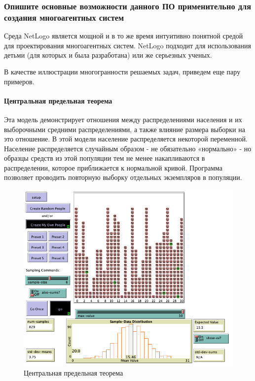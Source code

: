 \documentclass[14pt,a4paper,report]{report}
\begin{document}
\subsubsection{Опишите основные возможности данного ПО применительно для создания многоагентных систем}

Среда NetLogo является мощной и в то же время интуитивно понятной средой для проектирования многоагентных систем. NetLogo подходит для использования детьми (для которых и была разработана) или же серьезных ученых.

В качестве иллюстрации многогранности решаемых задач, приведем еще пару примеров.

\paragraph{Центральная предельная теорема}

Эта модель демонстрирует отношения между распределениями населения и их выборочными средними распределениями, а также влияние размера выборки на это отношение. В этой модели население распределяется некоторой переменной. Население распределяется случайным образом - не обязательно «нормально» - но образцы средств из этой популяции тем не менее накапливаются в распределении, которое приближается к нормальной кривой. Программа позволяет проводить повторную выборку отдельных экземпляров в популяции.

\begin{figure}[h!]
	\centering
	\includegraphics[scale = 0.49]{images/9.png}
	\caption{Центральная предельная теорема}
\end{figure}
\clearpage
\end{document}
